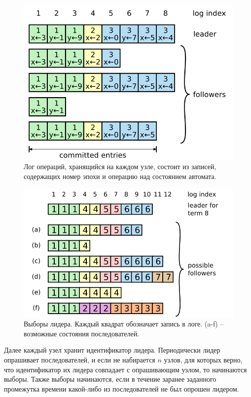\documentclass[pdftex,ptm,14pt,a4paper]{extreport}
\theoremstyle{definition}
\begin{document}
\begin{figure}
    \centering
    \includegraphics[scale=0.5]{raft-logs.png}
    \caption{Лог операций, хранящийся на каждом узле, состоит из записей, содержащих номер эпохи
             и операцию над состоянием автомата.}
\end{figure}

\begin{figure}
    \centering
    \includegraphics[scale=0.5]{raft-election.png}
    \caption{Выборы лидера. Каждый квадрат обозначает запись в логе. (a-f) -- возможные состояния последователей.}
\end{figure}

Далее каждый узел хранит идентификатор лидера.
Периодически лидер опрашивает последователей, и если не набирается $n$ узлов, для которых верно,
что идентификатор их лидера совпадает с опрашивающим узлом, то начинаются выборы.
Также выборы начинаются, если в течение заранее заданного промежутка времени какой-либо из последователей не был опрошен лидером.
\end{document}
